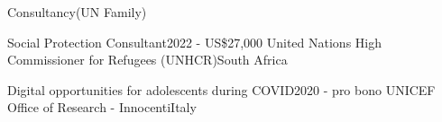 \begin{rSection}{Consultancy(UN Family)}

\begin{rSubsection}
{Social Protection Consultant}{2022 - US\$27,000}
{United Nations High Commissioner for Refugees (UNHCR)}{South Africa}\par
\end{rSubsection}

\begin{rSubsection}
{Digital opportunities for adolescents during COVID}{2020 - pro bono}
{UNICEF Office of Research - Innocenti}{Italy}\par
\end{rSubsection}

\end{rSection}